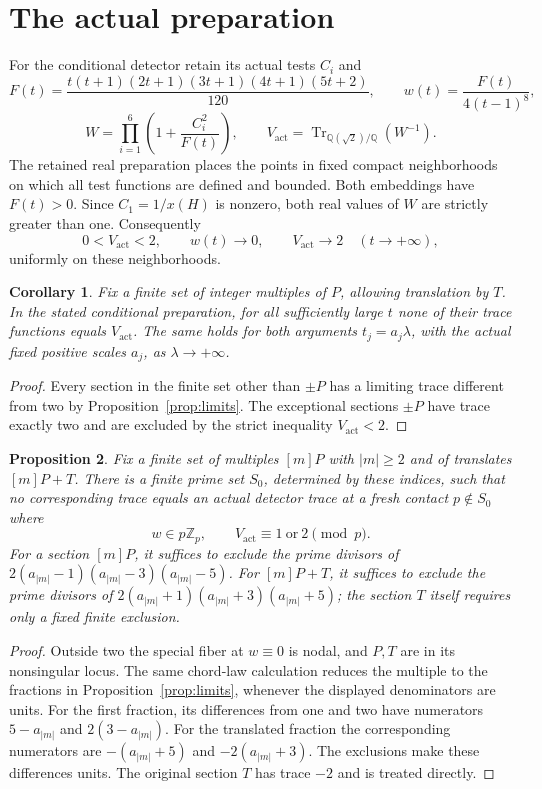 \documentclass[11pt,a4paper]{article}
\newtheorem{proposition}{Proposition}
\newtheorem{corollary}[proposition]{Corollary}
\newcommand{\Q}{\mathbb Q}\newcommand{\Z}{\mathbb Z}
\DeclareMathOperator{\Tr}{Tr}
\begin{document}
\section{The actual preparation}
For the conditional detector retain its actual tests $C_i$ and
\[
 F(t)=\frac{t(t+1)(2t+1)(3t+1)(4t+1)(5t+2)}{120},\qquad
 w(t)=\frac{F(t)}{4(t-1)^8},
\]
\[
 W=\prod_{i=1}^{6}\left(1+\frac{C_i^2}{F(t)}\right),
 \qquad V_{\mathrm{act}}=\Tr_{\Q(\sqrt2)/\Q}(W^{-1}).
\]
The retained real preparation places the points in fixed compact
neighborhoods on which all test functions are defined and bounded.
Both embeddings have $F(t)>0$. Since $C_1=1/x(H)$ is nonzero,
both real values of $W$ are strictly greater than one. Consequently
\[
 0<V_{\mathrm{act}}<2,\qquad
 w(t)\longrightarrow0,\qquad
 V_{\mathrm{act}}\longrightarrow2\quad(t\longrightarrow+\infty),
\]
uniformly on these neighborhoods.

\begin{corollary}\label{cor:tail}
Fix a finite set of integer multiples of $P$, allowing translation
by $T$. In the stated conditional preparation, for all sufficiently
large $t$ none of their trace functions equals $V_{\mathrm{act}}$.
The same holds for both arguments $t_j=a_j\lambda$, with the
actual fixed positive scales $a_j$, as $\lambda\longrightarrow+\infty$.
\end{corollary}
\begin{proof}
Every section in the finite set other than $\pm P$ has a limiting
trace different from two by Proposition~\ref{prop:limits}.
The exceptional sections $\pm P$ have trace exactly two and are
excluded by the strict inequality $V_{\mathrm{act}}<2$.
\end{proof}

\begin{proposition}\label{prop:contact}
Fix a finite set of multiples $[m]P$ with $|m|\ge2$ and of
translates $[m]P+T$. There is a finite prime set $S_0$, determined
by these indices, such that no corresponding trace equals an actual
detector trace at a fresh contact $p\notin S_0$ where
\[
            w\in p\Z_p,\qquad V_{\mathrm{act}}\equiv1
                    \ \text{or}\ 2\pmod p.
\]
For a section $[m]P$, it suffices to exclude the prime divisors of
$2(a_{|m|}-1)(a_{|m|}-3)(a_{|m|}-5)$.
For $[m]P+T$, it suffices to exclude the prime divisors of
$2(a_{|m|}+1)(a_{|m|}+3)(a_{|m|}+5)$; the section $T$ itself
requires only a fixed finite exclusion.
\end{proposition}
\begin{proof}
Outside two the special fiber at $w\equiv0$ is nodal, and $P,T$
are in its nonsingular locus. The same chord-law calculation
reduces the multiple to the fractions in
Proposition~\ref{prop:limits}, whenever the displayed denominators
are units. For the first fraction, its differences from one and
two have numerators $5-a_{|m|}$ and $2(3-a_{|m|})$.
For the translated fraction the corresponding numerators are
$-(a_{|m|}+5)$ and $-2(a_{|m|}+3)$. The exclusions make these
differences units. The original section $T$ has trace $-2$ and
is treated directly.
\end{proof}
\end{document}
